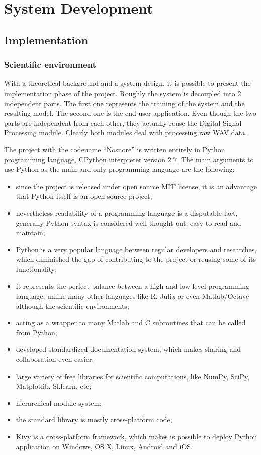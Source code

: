 \section{System Development}\label{sec:development}

\subsection{Implementation}
\subsubsection{Scientific environment}
With a theoretical background and a system design, it is possible to present the implementation phase of the project. Roughly the system is decoupled into 2 independent parts. The first one represents the training of the system and the resulting model. The second one is the end-user application. Even though the two parts are independent from each other, they actually reuse the Digital Signal Processing module. Clearly both modules deal with processing raw WAV data.

The project with the codename ``Nosnore'' is written entirely in Python programming language, CPython interpreter version $2.7$. The main arguments to use Python as the main and only programming language are the following:

\begin{itemize}[topsep=5pt, partopsep=0pt,itemsep=3pt,parsep=1pt]
 \item since the project is released under open source MIT license, it is an advantage that Python itself is an open source project;
 \item nevertheless readability of a programming language is a disputable fact, generally Python syntax is considered well thought out, easy to read and maintain;
 \item Python is a very popular language between regular developers and researches, which diminished the gap of contributing to the project or reusing some of its functionality;
 \item it represents the perfect balance between a high and low level programming language, unlike many other languages like R, Julia or even Matlab/Octave although the scientific environments;
 \item acting as a wrapper to many Matlab and C subroutines that can be called from Python;
 \item developed standardized documentation system, which makes sharing and collaboration even easier;
 \item large variety of free libraries for scientific computations, like NumPy, SciPy, Matplotlib, Sklearn, etc;
 \item hierarchical module system;
 \item the standard library is mostly cross-platform code;
 \item Kivy is a cross-platform framework, which makes is possible to deploy Python application on Windows, OS X, Linux, Android and iOS.
\end{itemize}

